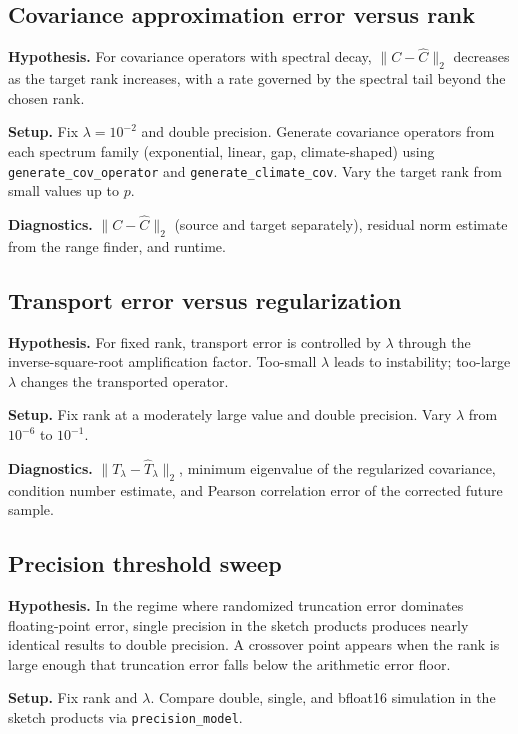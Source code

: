 \subsection{Covariance approximation error versus rank}

\textbf{Hypothesis.}  For covariance operators with spectral decay,
\(\|C - \widehat C\|_2\) decreases as the target rank increases, with a rate
governed by the spectral tail beyond the chosen rank.

\textbf{Setup.}  Fix \(\lambda = 10^{-2}\) and double precision.  Generate
covariance operators from each spectrum family (exponential, linear, gap,
climate-shaped) using \texttt{generate\_cov\_operator} and
\texttt{generate\_climate\_cov}.  Vary the target rank from small values up to
\(p\).

\textbf{Diagnostics.}  \(\|C - \widehat C\|_2\) (source and target
separately), residual norm estimate from the range finder, and runtime.

\subsection{Transport error versus regularization}

\textbf{Hypothesis.}  For fixed rank, transport error is controlled by
\(\lambda\) through the inverse-square-root amplification factor.  Too-small
\(\lambda\) leads to instability; too-large \(\lambda\) changes the transported
operator.

\textbf{Setup.}  Fix rank at a moderately large value and double precision.
Vary \(\lambda\) from \(10^{-6}\) to \(10^{-1}\).

\textbf{Diagnostics.}  \(\|T_\lambda - \widehat T_\lambda\|_2\), minimum
eigenvalue of the regularized covariance, condition number estimate, and
Pearson correlation error of the corrected future sample.

\subsection{Precision threshold sweep}

\textbf{Hypothesis.}  In the regime where randomized truncation error
dominates floating-point error, single precision in the sketch products
produces nearly identical results to double precision.  A crossover point
appears when the rank is large enough that truncation error falls below the
arithmetic error floor.

\textbf{Setup.}  Fix rank and \(\lambda\).  Compare double, single, and
bfloat16 simulation in the sketch products via
\texttt{precision\_model}.

